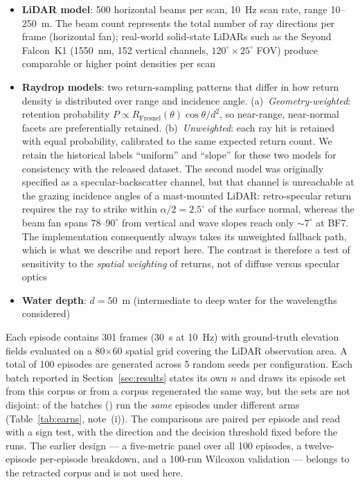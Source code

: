 \documentclass[review]{elsarticle}
\begin{document}
\begin{itemize}
    higher-order corpus, which carries the headline ablations, does \emph{not}
    lie exactly in that space (Section~\ref{sec:res_scope}).
  \item \textbf{LiDAR model}: 500 horizontal beams per scan,
    10~Hz scan rate, range 10--250~m.  The beam count represents the
    total number of ray directions per frame (horizontal fan);
    real-world solid-state LiDARs such as the Seyond Falcon~K1
    (1550~nm, 152 vertical channels, $120^\circ \times 25^\circ$ FOV)
    produce comparable or higher point densities per scan
  \item \textbf{Raydrop models}: two return-sampling patterns that differ
    in how return density is distributed over range and incidence angle.
    (a)~\emph{Geometry-weighted}: retention probability
    $P\propto R_{\text{Fresnel}}(\theta)\cos\theta/d^2$, so near-range,
    near-normal facets are preferentially retained.
    (b)~\emph{Unweighted}: each ray hit is retained with equal
    probability, calibrated to the same expected return count.
    We retain the historical labels ``uniform'' and ``slope'' for
    these two models for consistency with the released dataset.
    The second model was originally specified as a specular-backscatter
    channel, but that channel is unreachable at the grazing incidence
    angles of a mast-mounted LiDAR: retro-specular return requires the
    ray to strike within $\alpha/2 = 2.5^\circ$ of the surface normal,
    whereas the beam fan spans $78$--$90^\circ$ from vertical and wave
    slopes reach only ${\sim}7^\circ$ at BF7.  The implementation
    consequently always takes its unweighted fallback path, which is
    what we describe and report here.  The contrast is therefore a test
    of sensitivity to the \emph{spatial weighting} of returns, not of
    diffuse versus specular optics
  \item \textbf{Water depth}: $d = 50$~m (intermediate to deep water
    for the wavelengths considered)
\end{itemize}

Each episode contains 301 frames (30~s at 10~Hz) with ground-truth
elevation fields evaluated on a 80$\times$60 spatial grid
covering the LiDAR observation area.
A total of 100 episodes are generated across 5 random seeds per
configuration.
Each batch reported in Section~\ref{sec:results} states its own $n$ and draws its
episode set from this corpus or from a corpus regenerated the same way, but the sets
are not disjoint: \HosSameN{} of the batches (\HosSameRows{}) run the \emph{same}
\AblationEps{} episodes under different arms (Table~\ref{tab:earns}, note~(i)). The
comparisons are paired per episode and read with a sign test, with the direction and
the decision threshold fixed before the runs. The earlier design --- a five-metric
panel over all 100 episodes, a twelve-episode per-episode breakdown, and a
100-run Wilcoxon validation --- belongs to the retracted corpus and is not used
here.
\end{document}
